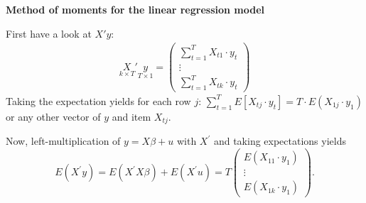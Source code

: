\documentclass{article}
\begin{document}
\begin{solution}
\textbf{Method of moments for the linear regression model}

First have a look at $X'y$:
\begin{align*}
  \underset{k\times T}{X}'\underset{T \times 1}{y} =
  \begin{pmatrix}
    \sum_{t=1}^T X_{t1}\cdot y_t\\
    \vdots\\
    \sum_{t=1}^T X_{tk}\cdot y_t
  \end{pmatrix}
\end{align*}
Taking the expectation yields for each row $j$: $\sum_{t=1}^T E[X_{tj}\cdot
y_t] = T\cdot E(X_{1j} \cdot y_1)$ or any other vector of $y$ and item
$X_{tj}$.

Now, left-multiplication of $y=X\beta +u$ with $X^{\prime }$ and taking expectations yields%
\begin{equation*}
E\left( X^{\prime }y\right) =E\left( X^{\prime }X\beta \right) +E\left(
X^{\prime }u\right) = T
\begin{pmatrix}
    E(X_{11}\cdot y_1)\\
    \vdots\\
    E(X_{1k}\cdot y_1)
\end{pmatrix}.
\end{equation*}%



\end{solution}
\end{document}
